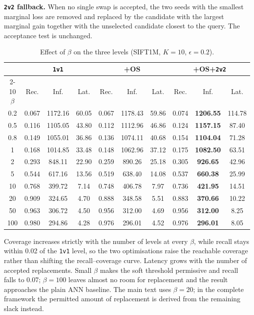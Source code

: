 \documentclass[conference]{IEEEtran}
\begin{document}
\textbf{\texttt{2v2} fallback.} When no single swap is accepted, the two seeds
with the smallest marginal loss are removed and replaced by the candidate with
the largest marginal gain together with the unselected candidate closest to the
query. The acceptance test is unchanged.

\begin{table}[h]
\caption{Effect of $\beta$ on the three levels (SIFT1M, $K{=}10$,
$\epsilon{=}0.2$).}
\label{tab:s4-beta}
\begin{center}
\scriptsize
\setlength{\tabcolsep}{2.2pt}
\begin{tabular}{|c|c|c|c|c|c|c|c|c|c|}
\hline
& \multicolumn{3}{c|}{\texttt{1v1}} & \multicolumn{3}{c|}{+OS} & \multicolumn{3}{c|}{+OS+\texttt{2v2}} \\
\cline{2-10}
$\beta$ & Rec. & Inf. & Lat. & Rec. & Inf. & Lat. & Rec. & Inf. & Lat. \\
\hline
0.2 & 0.067 & 1172.16 & 60.05 & 0.067 & 1178.43 & 59.86 & 0.074 & \textbf{1206.55} & 114.78 \\
0.5 & 0.116 & 1105.05 & 43.80 & 0.112 & 1112.96 & 46.86 & 0.124 & \textbf{1157.15} & 87.40 \\
0.8 & 0.149 & 1055.01 & 36.86 & 0.136 & 1074.11 & 40.68 & 0.154 & \textbf{1104.04} & 71.28 \\
1   & 0.168 & 1014.85 & 33.48 & 0.148 & 1062.96 & 37.12 & 0.175 & \textbf{1082.50} & 63.51 \\
2   & 0.293 & 848.11  & 22.90 & 0.259 & 890.26  & 25.18 & 0.305 & \textbf{926.65}  & 42.96 \\
5   & 0.544 & 617.16  & 13.56 & 0.519 & 638.40  & 14.08 & 0.537 & \textbf{660.38}  & 25.99 \\
10  & 0.768 & 399.72  & 7.14  & 0.748 & 406.78  & 7.97  & 0.736 & \textbf{421.95}  & 14.51 \\
20  & 0.909 & 324.65  & 4.70  & 0.888 & 348.58  & 5.51  & 0.883 & \textbf{370.66}  & 10.22 \\
50  & 0.963 & 306.72  & 4.50  & 0.956 & 312.00  & 4.69  & 0.956 & \textbf{312.00}  & 8.25 \\
100 & 0.980 & 294.86  & 4.28  & 0.976 & 296.01  & 4.52  & 0.976 & \textbf{296.01}  & 8.05 \\
\hline
\end{tabular}
\end{center}
\end{table}

Coverage increases strictly with the number of levels at every $\beta$, while
recall stays within 0.02 of the \texttt{1v1} level, so the two optimisations
raise the reachable coverage rather than shifting the recall--coverage curve.
Latency grows with the number of accepted replacements. Small $\beta$ makes the
soft threshold permissive and recall falls to 0.07; $\beta{=}100$ leaves almost
no room for replacement and the result approaches the plain ANN baseline. The
main text uses $\beta{=}20$; in the complete framework the permitted amount of
replacement is derived from the remaining slack instead.
\end{document}
